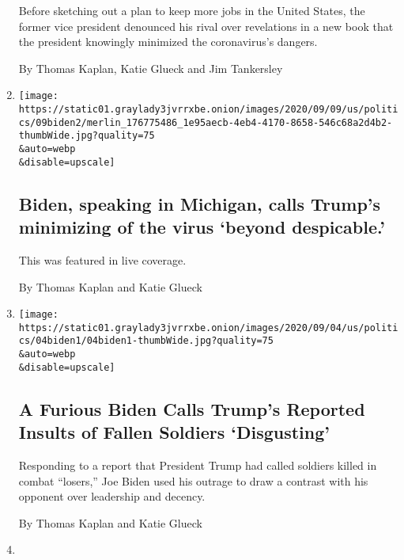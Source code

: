 \begin{enumerate}
  Before sketching out a plan to keep more jobs in the United States,
  the former vice president denounced his rival over revelations in a
  new book that the president knowingly minimized the coronavirus's
  dangers.

  By Thomas Kaplan, Katie Glueck and Jim Tankersley
\item
  \href{/live/2020/09/09/us/trump-vs-biden/biden-speaking-in-michigan-calls-trumps-minimizing-of-the-virus-beyond-despicable}{}

  \texttt{[image: https://static01.graylady3jvrrxbe.onion/images/2020/09/09/us/politics/09biden2/merlin\_176775486\_1e95aecb-4eb4-4170-8658-546c68a2d4b2-thumbWide.jpg?quality=75\\\&auto=webp\\\&disable=upscale]}

  \hypertarget{biden-speaking-in-michigan-calls-trumps-minimizing-of-the-virus-beyond-despicable}{%
  \subsection{Biden, speaking in Michigan, calls Trump's minimizing of
  the virus `beyond
  despicable.'}\label{biden-speaking-in-michigan-calls-trumps-minimizing-of-the-virus-beyond-despicable}}

  This was featured in live coverage.

  By Thomas Kaplan and Katie Glueck
\item
  \href{/2020/09/04/us/politics/biden-trump-soliders-insults.html}{}

  \texttt{[image: https://static01.graylady3jvrrxbe.onion/images/2020/09/04/us/politics/04biden1/04biden1-thumbWide.jpg?quality=75\\\&auto=webp\\\&disable=upscale]}

  \hypertarget{a-furious-biden-calls-trumps-reported-insults-of-fallen-soldiers-disgusting}{%
  \subsection{A Furious Biden Calls Trump's Reported Insults of Fallen
  Soldiers
  `Disgusting'}\label{a-furious-biden-calls-trumps-reported-insults-of-fallen-soldiers-disgusting}}

  Responding to a report that President Trump had called soldiers killed
  in combat ``losers,'' Joe Biden used his outrage to draw a contrast
  with his opponent over leadership and decency.

  By Thomas Kaplan and Katie Glueck
\item
  \href{/live/2020/09/04/us/trump-vs-biden/biden-calls-trumps-reported-remarks-disgusting-and-says-they-would-make-him-unfit-to-lead}{}


\end{enumerate}
